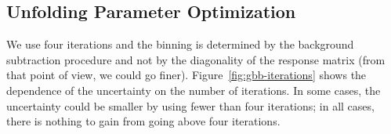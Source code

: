 \subsection{Unfolding Parameter Optimization}
\label{sec:gbb-unfolding:optimization}

We use four iterations and the binning is determined by the background subtraction procedure and not by the diagonality of the response matrix (from that point of view, we could go finer).  Figure~\ref{fig:gbb-iterations} shows the dependence of the uncertainty on the number of iterations.  In some cases, the uncertainty could be smaller by using fewer than four iterations; in all cases, there is nothing to gain from going above four iterations.



